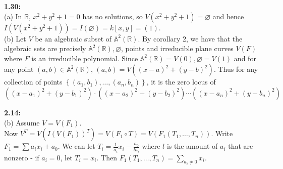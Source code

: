 \documentclass[a4paper]{article}
\begin{document}
   \textbf{1.30:}\\
   (a) In $\mathbb{R}$, $x^2 + y^2 + 1 = 0$ has no solutions, so
   $V \left( x^2 + y^2 + 1 \right) = \varnothing$ and hence
   $I \left( V\left( x^2 + y^2 +1 \right)  \right) = I\left( \varnothing \right) 
   = k\left[ x, y \right] = (1)$.\\
   \linebreak
   (b) Let $V$ be an algebraic subset of $\mathbb{A}^2 \left( \mathbb{R}
   \right) $.
   By corollary $2$, we have that the algebraic sets are precisely
   $\mathbb{A}^2 \left( \mathbb{R} \right) , \varnothing$, points and
   irreducible plane curves $V(F)$ where $F$ is an irreducible polynomial.
   Since $\mathbb{A}^2 \left( \mathbb{R} \right) = V(0), \varnothing = V(1)$
   and
   for any point $\left( a,b \right) \in \mathbb{A}^2 (\mathbb{R})$,
    $(a,b) = V\left( (x-a)^2 + (y-b)^2 \right) $. Thus for any collection
    of points $\left\{ \left( a_1, b_1 \right) ,\ldots
    , \left( a_n, b_n \right) \right\} $, it is the zero locus
    of 
    \[\left( (x-a_1)^2 + (y-b_1)^2 \right)\cdot  \left( (x-a_2)^2 + (y-b_2)^2 \right) 
    \cdots \left( (x-a_n)^2 + (y-b_n)^2 \right) \]


\textbf{2.14:}\\
(b) Assume $V = V(F_1)$.\\
Now $V^{T} = V \left( I(V(F_1))^{T} \right) 
= V\left( F_1 \circ T \right)  = V\left( F_1 (T_1, \ldots, T_n) \right) $.
Write $F_1 = \sum a_i x_i + a_0 $. We can
let $T_i = \frac{1}{a_i} x_i - \frac{a_0}{l a_i} $ where
$l$ is the amount of $a_i$ that are nonzero - if $a_i = 0$, let
$T_i = x_i$. Then
$F_1 \left( T_1, \ldots, T_n \right) =
\sum_{a_i \neq 0} x_i $. \\
\linebreak
\end{document}
